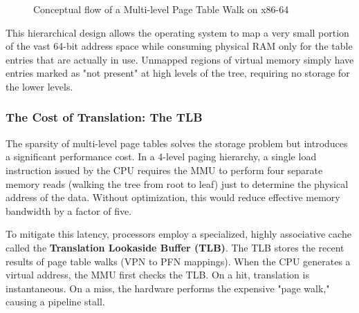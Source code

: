 \documentclass[a4paper,10pt,twoside]{report}
\theoremstyle{definition}
\begin{document}
\begin{figure}[htbp]
    \caption{Conceptual flow of a Multi-level Page Table Walk on x86-64}
    \label{fig:page_walk}
\end{figure}

This hierarchical design allows the operating system to map a very small portion of the vast 64-bit address space while consuming physical RAM only for the table entries that are actually in use. Unmapped regions of virtual memory simply have entries marked as "not present" at high levels of the tree, requiring no storage for the lower levels.

\subsubsection{The Cost of Translation: The TLB}

The sparsity of multi-level page tables solves the storage problem but introduces a significant performance cost. In a 4-level paging hierarchy, a single load instruction issued by the CPU requires the MMU to perform four separate memory reads (walking the tree from root to leaf) just to determine the physical address of the data. Without optimization, this would reduce effective memory bandwidth by a factor of five.

To mitigate this latency, processors employ a specialized, highly associative cache called the \textbf{Translation Lookaside Buffer (TLB)}. The TLB stores the recent results of page table walks (VPN to PFN mappings). When the CPU generates a virtual address, the MMU first checks the TLB. On a hit, translation is instantaneous. On a miss, the hardware performs the expensive "page walk," causing a pipeline stall.
\end{document}
